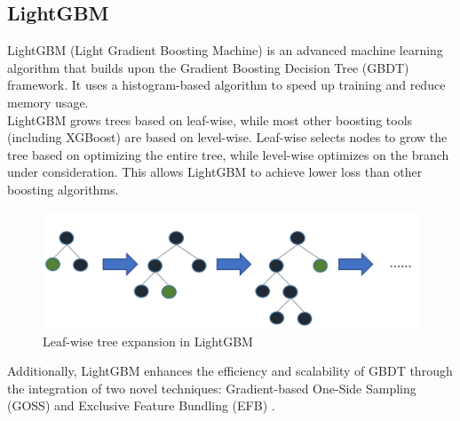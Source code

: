 \documentclass{ieeeojies}
\begin{document}
\subsection{LightGBM}
LightGBM (Light Gradient Boosting Machine) is an advanced machine learning algorithm that builds upon the Gradient Boosting Decision Tree (GBDT) framework. It uses a histogram-based algorithm to speed up training and reduce memory usage.\\
LightGBM grows trees based on leaf-wise, while most other boosting tools (including XGBoost) are based on level-wise. Leaf-wise selects nodes to grow the tree based on optimizing the entire tree, while level-wise optimizes on the branch under consideration. This allows LightGBM to achieve lower loss than other boosting algorithms.
\begin{figure}[H]
    \centering
    \includegraphics[width=0.8\linewidth]{./image/LightGBM.png}
    \caption{Leaf-wise tree expansion in LightGBM}
    \label{fig:11}
\end{figure}
\noindent
Additionally, LightGBM enhances the efficiency and scalability of GBDT through the integration of two novel techniques: Gradient-based One-Side Sampling (GOSS) and Exclusive Feature Bundling (EFB) \cite{b9}.\\
\end{document}
